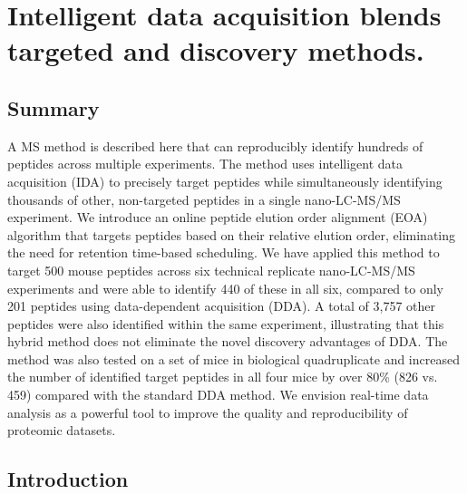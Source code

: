 \chapter{Intelligent data acquisition blends targeted and discovery methods.}

\section{Summary}

A MS method is described here that can reproducibly identify hundreds of peptides across multiple experiments. The method uses intelligent data acquisition (IDA) to precisely target peptides while simultaneously identifying thousands of other, non-targeted peptides in a single nano-LC-MS/MS experiment. We introduce an online peptide elution order alignment (EOA) algorithm that targets peptides based on their relative elution order, eliminating the need for retention time-based scheduling. We have applied this method to target 500 mouse peptides across six technical replicate nano-LC-MS/MS experiments and were able to identify 440 of these in all six, compared to only 201 peptides using data-dependent acquisition (DDA). A total of 3,757 other peptides were also identified within the same experiment, illustrating that this hybrid method does not eliminate the novel discovery advantages of DDA. The method was also tested on a set of mice in biological quadruplicate and increased the number of identified target peptides in all four mice by over 80\% (826 vs. 459) compared with the standard DDA method. We envision real-time data analysis as a powerful tool to improve the quality and reproducibility of proteomic datasets.

\section{Introduction}

